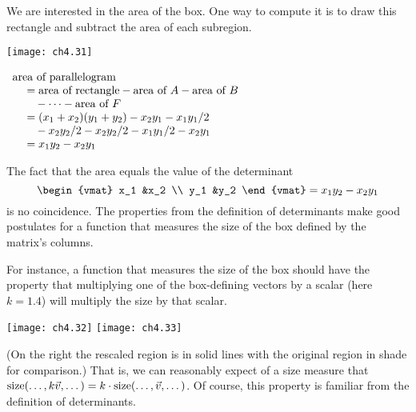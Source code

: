 We are interested in the area of the box.
One way to compute it is to draw this rectangle
and subtract the area of each subregion.
\begin{center}
  \parbox{1.5in}{\hbox{}\hfil\texttt{[image: ch4.31]}\hfil\hbox{}}
  \quad
  \parbox{3.0in}{
    \hbox{}\hfil
    $\begin{array}{l}
       \text{area of parallelogram}                    \\
         \hbox{}\quad \hbox{}
            =\text{area of rectangle}
                -\text{area of $A$}-\text{area of $B$} \\
         \hbox{}\qquad \hbox{}
            -\cdots-\text{area of $F$}                   \\
         \hbox{}\quad \hbox{}
            =(x_1+x_2)(y_1+y_2)-x_2y_1-x_1y_1/2        \\
         \hbox{}\qquad \hbox{}
            -x_2y_2/2-x_2y_2/2-x_1y_1/2-x_2y_1         \\
         \hbox{}\quad \hbox{}
            =x_1y_2-x_2y_1        
    \end{array}$
    \hfil\hbox{}}
\end{center}
The fact that the area equals the value of the determinant
\begin{equation*}
  \begin{vmat}
    x_1  &x_2  \\
    y_1  &y_2
  \end{vmat}
  =x_1y_2-x_2y_1
\end{equation*}
is no coincidence.
The properties from the definition of determinants 
make good postulates for a function 
that measures the size of the box
defined by the matrix's columns.

For instance, a function that measures the size of the box
should have the property that multiplying one of the box-defining vectors by
a scalar (here $k=1.4$)
will multiply the size by that scalar.
\begin{center}
  \texttt{[image: ch4.32]}
  \qquad
  \texttt{[image: ch4.33]}
\end{center}
(On the right the rescaled region is in solid lines with the 
original region in shade for comparison.)
That is, we can reasonably expect of a size measure that
$\operatorname{size} (\dots,k\vec{v},\dots)=k\cdot\operatorname{size} (\dots,\vec{v},\dots)$.
Of course, this property is familiar from 
the definition of determinants.

